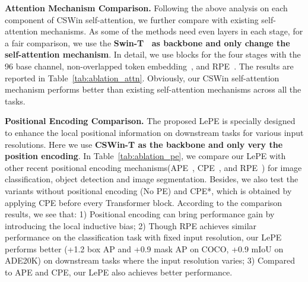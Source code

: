 \documentclass[10pt,twocolumn,letterpaper]{article}
\newcommand{\Tref}[1]{Table~\ref{#1}}
\begin{document}
\noindent \textbf{Attention Mechanism Comparison.} 
Following the above analysis on each component of CSWin self-attention, we further compare with existing self-attention mechanisms. As some of the methods need even layers in each stage, for a fair comparison, we use the \textbf{Swin-T~\cite{liu2021swin} as backbone and only change the self-attention mechanism}. In detail, we use  blocks for the four stages with the 96 base channel, non-overlapped token embedding~\cite{dosovitskiy2020vit}, and RPE~\cite{liu2021swin}. The results are reported in Table~\ref{tab:ablation_attn}. Obviously, our CSWin self-attention mechanism performs better than existing self-attention mechanisms across all the tasks. 


\noindent \textbf{Positional Encoding Comparison.}
The proposed LePE is specially designed to enhance the local positional information on downstream tasks for various input resolutions. Here we use \textbf{CSWin-T as the backbone and only very the position encoding}. In
\Tref{tab:ablation_pe}, we compare our LePE with other recent positional encoding mechanisms(APE~\cite{dosovitskiy2020vit}, CPE~\cite{chu2021conditional}, and RPE~\cite{shaw2018self}) for image classification, object detection and image segmentation. Besides, we also test the variants without positional encoding (No PE) and CPE*, which is obtained by applying CPE before every Transformer block. According to the comparison results, we see that: 1) Positional encoding can bring performance gain by introducing the local inductive bias; 2) Though RPE achieves similar performance on the classification task with fixed input resolution, our LePE performs better (+1.2 box AP and +0.9 mask AP on COCO, +0.9 mIoU on ADE20K) on downstream tasks where the input resolution varies; 3) Compared to APE and CPE, our LePE also achieves better performance.
\end{document}
